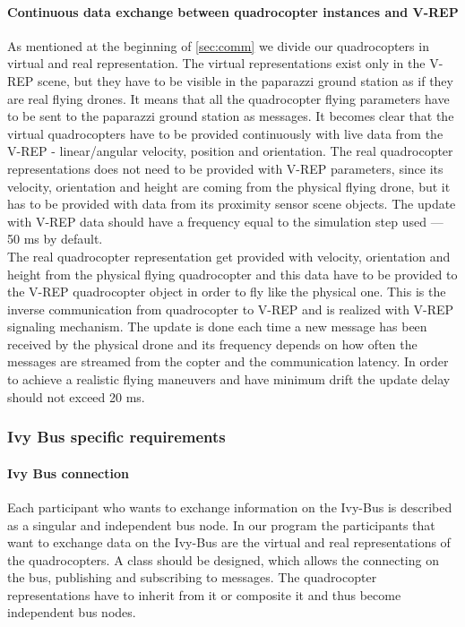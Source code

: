 \paragraph{Continuous data exchange between quadrocopter instances and V-REP}

As mentioned at the beginning of \ref{sec:comm} we divide our quadrocopters in virtual and real representation. 
The virtual representations exist only in the V-REP scene, but they have to be visible in the paparazzi ground station as if they are real flying drones. 
It means that all the quadrocopter flying parameters have to be sent to the paparazzi ground station as messages. 
It becomes clear that the virtual quadrocopters have to be provided continuously with live data from the V-REP - linear/angular velocity, position and orientation. 
The real quadrocopter representations does not need to be provided with V-REP parameters, since its velocity, orientation and height are coming from the physical flying drone, but it has to be provided with data from its proximity sensor scene objects. 
The update with V-REP data should have a frequency equal to the simulation step used --- 50 ms by default.\\
The real quadrocopter representation get provided with velocity, orientation and height from the physical flying quadrocopter and this data have to be provided to the V-REP quadrocopter object in order to fly like the physical one. 
This is the inverse communication from quadrocopter to V-REP and is realized with V-REP signaling mechanism. 
The update is done each time a new message has been received by the physical drone and its frequency depends on how often the messages are streamed from the copter and the communication latency. In order to achieve a realistic flying maneuvers and have minimum drift the update delay should not exceed 20 ms.

\subsubsection{Ivy Bus specific requirements}
\label{sec:requirementsIVYBus}
\paragraph{Ivy Bus connection}
Each participant who wants to exchange information on the Ivy-Bus is described as a singular and independent bus node. 
In our program the participants that want to exchange data on the Ivy-Bus are the virtual and real representations of the quadrocopters. 
A class should be designed, which allows the connecting on the bus, publishing and subscribing to messages. 
The quadrocopter representations have to inherit from it or composite it and thus become independent bus nodes.


